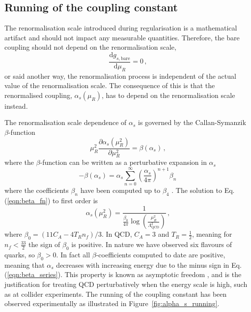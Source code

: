 \documentclass[main.tex]{subfiles}
\begin{document}
\subsection{Running of the coupling constant}\label{sec:alpha_running}
    The renormalisation scale introduced during regularisation
    is a mathematical artifact and should not impact any measurable
    quantities. Therefore, the bare coupling should not depend on
    the renormalisation scale,
    \begin{equation}\label{eqn:d_g_bare_d_mu}
        \dfrac{\mathrm{d}g_{s,\mathrm{bare}}}{\mathrm{d}\mu_{R}} = 0 \, ,
    \end{equation}
    or said another way, the renormalisation process
    is independent of the actual value of the renormalisation scale.
    The consequence of this is that the renormalised coupling, $\alpha_{s}(\mu_{R})$, has to
    depend on the renormalisation scale instead.

    The renormalisation scale dependence of $\alpha_{s}$
    is governed by the Callan-Symanzik 
    $\beta$-function \cite{Callan:1970yg,Symanzik:1970rt}
    \begin{equation}\label{eqn:beta_fn}
        \mu_{R}^{2} \dfrac{\partial \alpha_{s}(\mu_{R}^{2})}{\partial \mu_{R}^{2}} = \beta(\alpha_{s}) \, ,
    \end{equation}
    where the $\beta$-function can be written as a perturbative
    expansion in $\alpha_{s}$
    \begin{equation}\label{eqn:beta_series}
        -\beta(\alpha_{s}) = \alpha_{s}\sum_{n=0}^{\infty}\left(\dfrac{\alpha_{s}}{4\pi}\right)^{n+1} \beta_{n}\, 
    \end{equation}
    where the coefficients $\beta_{n}$ have been computed
    up to $\beta_{4}$ \cite{Baikov:2016tgj,Luthe:2017ttg}.
    The solution to Eq. (\ref{eqn:beta_fn}) to first order
    is
    \begin{equation}\label{eqn:1l_alpha}
        \alpha_{s}(\mu_{R}^{2}) = \dfrac{1}{\frac{\beta_{0}}{4\pi}\log\left(\frac{\mu_{R}^{2}}{\Lambda_{\mathrm{QCD}}^{2}}\right)} \, ,
    \end{equation}
    where $\beta_{0} = (11C_{A} - 4T_{R}n_{f})/3$.
    In QCD, $C_{A}=3$ and $T_{R}=\frac{1}{2}$, meaning for
    $n_{f} < \frac{33}{2}$ the sign of $\beta_{0}$ is positive.
    In nature we have observed six flavours of quarks, so
    $\beta_{0} > 0$. In fact all $\beta$-coefficients
    computed to date are positive, meaning that $\alpha_{s}$
    decreases with increasing energy due to the minus sign
    in Eq. (\ref{eqn:beta_series}). This property is known as
    asymptotic freedom \cite{Gross:1973id,Politzer:1973fx},
    and is the justification for treating QCD perturbatively
    when the energy scale is high, such as at collider experiments.
    The running of the coupling constant has been
    observed experimentally as illustrated in Figure~\ref{fig:alpha_s_running}.
\end{document}
